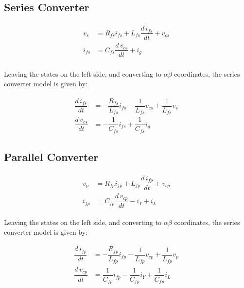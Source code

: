 \subsection{Series Converter}

\begin{align}
    \begin{aligned}
        v_s &= R_{fs}i_{fs} + L_{fs}\dfrac{d\,i_{fs}}{dt} + v_{cs} \\
        i_{fs} &= C_{fs}\dfrac{d\,v_{cs}}{dt} + i_g \\
    \end{aligned}
\end{align}

Leaving the states on the left side, and converting to $\alpha\beta$ coordinates, the series converter model is given by:

\begin{align}
    \begin{aligned}
        \dfrac{d\,i_{fs}}{dt} &= -\dfrac{R_{fs}}{L_{fs}}i_{fs} - \dfrac{1}{L_{fs}}v_{cs} + \dfrac{1}{L_{fs}}v_s \\
        \dfrac{d\,v_{cs}}{dt} &= -\dfrac{1}{C_{fs}}i_{fs} + \dfrac{1}{C_{fs}}i_g
    \end{aligned}
\end{align}

\subsection{Parallel Converter}

\begin{align}
    \begin{aligned}
        v_p &= R_{fp}i_{fp} + L_{fp}\dfrac{d\,i_{fp}}{dt} + v_{cp} \\
        i_{fp} &= C_{fp}\dfrac{d\,v_{cp}}{dt} - i_Y + i_L
    \end{aligned}
\end{align}

Leaving the states on the left side, and converting to $\alpha\beta$ coordinates, the series converter model is given by:

\begin{align}
    \begin{aligned}
        \dfrac{d\,i_{fp}}{dt} &= -\dfrac{R_{fp}}{L_{fp}}i_{fp} - \dfrac{1}{L_{fp}}v_{cp} + \dfrac{1}{L_{fp}}v_p \\
        \dfrac{d\,v_{cp}}{dt} &= \dfrac{1}{C_{fp}}i_{fp} - \dfrac{1}{C_{fp}}i_Y + \dfrac{1}{C_{fp}}i_L
    \end{aligned}
\end{align}


